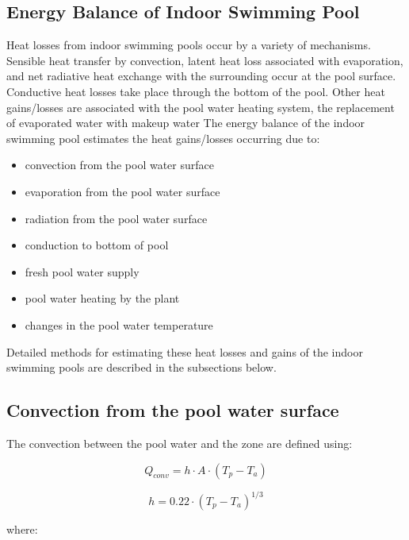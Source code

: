 \subsection{Energy Balance of Indoor Swimming Pool}\label{energy-balance-of-indoor-swimming-pool}

Heat losses from indoor swimming pools occur by a variety of mechanisms. Sensible heat transfer by convection, latent heat loss associated with evaporation, and net radiative heat exchange with the surrounding occur at the pool surface. Conductive heat losses take place through the bottom of the pool. Other heat gains/losses are associated with the pool water heating system, the replacement of evaporated water with makeup water The energy balance of the indoor swimming pool estimates the heat gains/losses occurring due to:

\begin{itemize}
\tightlist
\item
  convection from the pool water surface
\item
  evaporation from the pool water surface
\item
  radiation from the pool water surface
\item
  conduction to bottom of pool
\item
  fresh pool water supply
\item
  pool water heating by the plant
\item
  changes in the pool water temperature
\end{itemize}

Detailed methods for estimating these heat losses and gains of the indoor swimming pools are described in the subsections below.

\subsection{Convection from the pool water surface}\label{convection-from-the-pool-water-surface}

The convection between the pool water and the zone are defined using:

\begin{equation}
Q_{conv} = h \cdot A \cdot (T_p - T_a)
\end{equation}

\begin{equation}
h = 0.22 \cdot (T_p - T_a)^{1/3}
\end{equation}

where:

